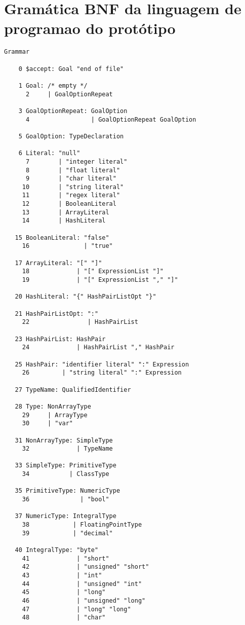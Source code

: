\chapter{Gram\'atica BNF da linguagem de programa\ca o do prot\'otipo}\begin{espacosimples}\begin{scriptsize}\begin{lstlisting}
Grammar

    0 $accept: Goal "end of file"
  
    1 Goal: /* empty */
      2     | GoalOptionRepeat
  
    3 GoalOptionRepeat: GoalOption
      4                 | GoalOptionRepeat GoalOption
  
    5 GoalOption: TypeDeclaration
  
    6 Literal: "null"
      7        | "integer literal"
      8        | "float literal"
      9        | "char literal"
     10        | "string literal"
     11        | "regex literal"
     12        | BooleanLiteral
     13        | ArrayLiteral
     14        | HashLiteral
  
   15 BooleanLiteral: "false"
     16               | "true"
  
   17 ArrayLiteral: "[" "]"
     18             | "[" ExpressionList "]"
     19             | "[" ExpressionList "," "]"
  
   20 HashLiteral: "{" HashPairListOpt "}"
  
   21 HashPairListOpt: ":"
     22                | HashPairList
  
   23 HashPairList: HashPair
     24             | HashPairList "," HashPair
  
   25 HashPair: "identifier literal" ":" Expression
     26         | "string literal" ":" Expression
  
   27 TypeName: QualifiedIdentifier
  
   28 Type: NonArrayType
     29     | ArrayType
     30     | "var"
  
   31 NonArrayType: SimpleType
     32             | TypeName
  
   33 SimpleType: PrimitiveType
     34           | ClassType
  
   35 PrimitiveType: NumericType
     36              | "bool"
  
   37 NumericType: IntegralType
     38            | FloatingPointType
     39            | "decimal"
  
   40 IntegralType: "byte"
     41             | "short"
     42             | "unsigned" "short"
     43             | "int"
     44             | "unsigned" "int"
     45             | "long"
     46             | "unsigned" "long"
     47             | "long" "long"
     48             | "char"
  

\end{lstlisting}
\end{scriptsize}
\end{espacosimples}
